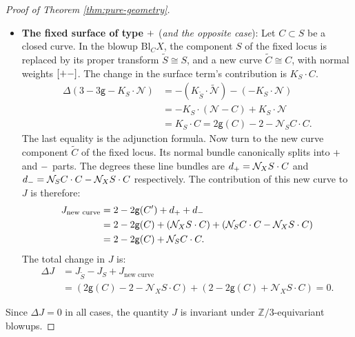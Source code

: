 \documentclass[10pt,a4paper]{amsart}
\newcommand{\lm}{\textup{\texttt{-}}}
\newcommand{\lp}{\textup{\texttt{+}}}
\begin{document}
\begin{proof}[Proof of Theorem \ref{thm:pure-geometry}]
\begin{itemize}
    \item  \textbf{The fixed surface of type $\lp$} (\textit{and the opposite case}): Let $C \subset S$ be a closed curve. In the blowup $\mathrm{Bl}_CX$, the component $S$ of the fixed locus is replaced by its proper transform $\widetilde{S}\cong S$, and a new curve $\widetilde C\cong C$, with normal weights $[\lp\lm]$. The change in the surface term's contribution is $K_S \cdot C$.
    \begin{align}
        \Delta(3-3\mathsf{g}-K_S\cdot\mathcal{N}) &= -(K_{\widetilde{S}}\cdot\widetilde{\mathcal{N}}) - (-K_S\cdot\mathcal{N})\\
        &= -K_S\cdot(\mathcal{N}-C) + K_S\cdot\mathcal{N}\\
        &= K_S \cdot C= 2\mathsf{g}(C) - 2 - \mathcal N_S C\cdot C.
    \end{align}
    The last equality is the adjunction formula. Now turn to the new curve component  $\widetilde C$ of the fixed locus. Its normal bundle canonically splits into $\lp$ and $\lm$ parts. The degrees these line bundles are $d_\lp = \mathcal{N}_XS \cdot C$ and $d_\lm = \mathcal N_S C\cdot C - \mathcal{N}_XS \cdot C$ respectively. The contribution of this new curve to $J$ is therefore:
    \begin{align}
        J_{\text{new curve}} &= 2 - 2\mathsf{g}(C') + d_\lp + d_\lm \\
        &= 2 - 2\mathsf{g}(C) + (\mathcal{N}_XS \cdot C) + (\mathcal N_S C\cdot C - \mathcal{N}_XS \cdot C) \\
        &= 2 - 2\mathsf{g}(C) + \mathcal N_S C\cdot C.
    \end{align}
    The total change in $J$ is:
    \begin{align}
        \Delta J &= J_{\widetilde S}-J_S+J_{\text{new curve}}\\
        &= (2\mathsf{g}(C) - 2 -  \mathcal{N}_XS \cdot C) + (2 - 2\mathsf{g}(C) +  \mathcal{N}_XS \cdot C) =0.
    \end{align}
\end{itemize}

Since $\Delta J = 0$ in all cases, the quantity $J$ is invariant under $\mathbb{Z}/3$-equivariant blowups.
\end{proof}
\end{document}
